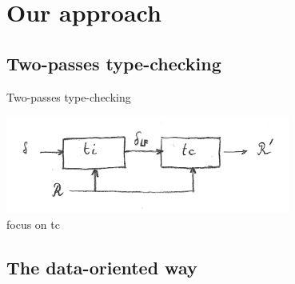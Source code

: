 \documentclass[ignorenonframetext,red]{beamer}
\begin{document}
\section{Our approach}

\subsection{Two-passes type-checking}

\begin{frame}{Two-passes type-checking}

  {\centering\includegraphics[width=0.7\textwidth]{images/tc-delta2.png}\\}
  focus on \textsf{tc}
\end{frame}

\subsection{The data-oriented way}
\end{document}
